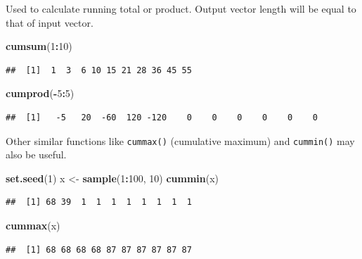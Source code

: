 \documentclass[
]{book}
\newenvironment{Shaded}{\begin{snugshade}}{\end{snugshade}}
\newcommand{\DecValTok}[1]{\textcolor[rgb]{0.00,0.00,0.81}{#1}}
\newcommand{\FunctionTok}[1]{\textcolor[rgb]{0.13,0.29,0.53}{\textbf{#1}}}
\newcommand{\NormalTok}[1]{#1}
\newcommand{\OtherTok}[1]{\textcolor[rgb]{0.56,0.35,0.01}{#1}}
\newcommand{\SpecialCharTok}[1]{\textcolor[rgb]{0.81,0.36,0.00}{\textbf{#1}}}
\begin{document}
Used to calculate running total or product. Output vector length will be equal to that of input vector.

\begin{Shaded}
\begin{Highlighting}[]
\FunctionTok{cumsum}\NormalTok{(}\DecValTok{1}\SpecialCharTok{:}\DecValTok{10}\NormalTok{)}
\end{Highlighting}
\end{Shaded}

\begin{verbatim}
##  [1]  1  3  6 10 15 21 28 36 45 55
\end{verbatim}

\begin{Shaded}
\begin{Highlighting}[]
\FunctionTok{cumprod}\NormalTok{(}\SpecialCharTok{{-}}\DecValTok{5}\SpecialCharTok{:}\DecValTok{5}\NormalTok{)}
\end{Highlighting}
\end{Shaded}

\begin{verbatim}
##  [1]   -5   20  -60  120 -120    0    0    0    0    0    0
\end{verbatim}

Other similar functions like \texttt{cummax()} (cumulative maximum) and \texttt{cummin()} may also be useful.

\begin{Shaded}
\begin{Highlighting}[]
\FunctionTok{set.seed}\NormalTok{(}\DecValTok{1}\NormalTok{)}
\NormalTok{x }\OtherTok{\textless{}{-}} \FunctionTok{sample}\NormalTok{(}\DecValTok{1}\SpecialCharTok{:}\DecValTok{100}\NormalTok{, }\DecValTok{10}\NormalTok{)}
\FunctionTok{cummin}\NormalTok{(x)}
\end{Highlighting}
\end{Shaded}

\begin{verbatim}
##  [1] 68 39  1  1  1  1  1  1  1  1
\end{verbatim}

\begin{Shaded}
\begin{Highlighting}[]
\FunctionTok{cummax}\NormalTok{(x)}
\end{Highlighting}
\end{Shaded}

\begin{verbatim}
##  [1] 68 68 68 68 87 87 87 87 87 87
\end{verbatim}
\end{document}
